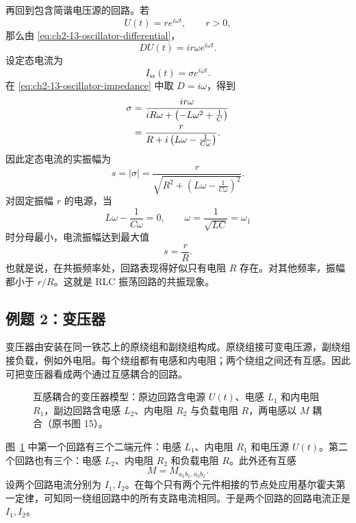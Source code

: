再回到包含简谐电压源的回路。若
\begin{equation}
 U(t)=re^{i\omega t},
 \qquad r>0,
 \label{eq:ch2-13-harmonic-loop-source}
\end{equation}
那么由 \eqref{eq:ch2-13-oscillator-differential}，
\begin{equation}
 DU(t)=ir\omega e^{i\omega t}.
 \label{eq:ch2-13-source-derivative}
\end{equation}
设定态电流为
\[
 I_{\mathrm{ss}}(t)=\sigma e^{i\omega t}.
\]
在 \eqref{eq:ch2-13-oscillator-impedance} 中取 \(D=i\omega\)，得到
\begin{align}
 \sigma
 &=\frac{ir\omega}
 {iR\omega+\left(-L\omega^2+\frac1C\right)}\notag\\
 &=\frac{r}{R+i\left(L\omega-\frac1{C\omega}\right)}.
 \label{eq:ch2-13-loop-complex-amplitude}
\end{align}
因此定态电流的实振幅为
\begin{equation}
 s=|\sigma|
 =\frac{r}
 {\sqrt{R^2+\left(L\omega-\frac1{C\omega}\right)^2}}.
 \label{eq:ch2-13-loop-amplitude}
\end{equation}
对固定振幅 \(r\) 的电源，当
\begin{equation}
 L\omega-\frac1{C\omega}=0,
 \qquad
 \omega=\frac1{\sqrt{LC}}=\omega_1
 \label{eq:ch2-13-loop-resonance}
\end{equation}
时分母最小，电流振幅达到最大值
\[
 s=\frac rR.
\]
也就是说，在共振频率处，回路表现得好似只有电阻 \(R\) 存在。对其他频率，振幅都小于 \(r/R\)。这就是 RLC 振荡回路的共振现象。

\subsection*{例题 2：变压器}

变压器由安装在同一铁芯上的原绕组和副绕组构成。原绕组接可变电压源，副绕组接负载，例如外电阻。每个绕组都有电感和内电阻；两个绕组之间还有互感。因此可把变压器看成两个通过互感耦合的回路。

\begin{figure}[H]
 \centering
 \resizebox{0.68\textwidth}{!}{}
 \caption{互感耦合的变压器模型：原边回路含电源 \(U(t)\)、电感 \(L_1\) 和内电阻 \(R_1\)，副边回路含电感 \(L_2\)、内电阻 \(R_2\) 与负载电阻 \(R\)，两电感以 \(M\) 耦合（原书图 15）。}
 \label{fig:ch2-13-transformer}
\end{figure}

图~\ref{fig:ch2-13-transformer} 中第一个回路有三个二端元件：电感 \(L_1\)、内电阻 \(R_1\) 和电压源 \(U(t)\)。第二个回路也有三个：电感 \(L_2\)、内电阻 \(R_2\) 和负载电阻 \(R\)。此外还有互感
\[
 M=M_{a_1b_1,a_2b_2}.
\]
设两个回路电流分别为 \(I_1,I_2\)。在每个只有两个元件相接的节点处应用基尔霍夫第一定律，可知同一绕组回路中的所有支路电流相同。于是两个回路的回路电流正是 \(I_1,I_2\)。

